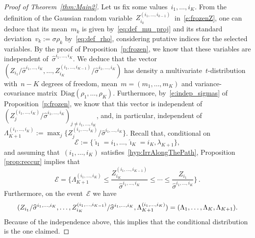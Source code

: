 \documentclass[final,numbib]{imaiai}%
\numberwithin{equation}{section}
\def\eq{\begin{equation}}
\def\qe{\end{equation}}
\renewcommand{\hat}{\widehat}
\newcommand{\<}{\langle}
\renewcommand{\>}{\rangle}
\newcommand{\1}{\mathds{1}}
\begin{document}
{\begin{proof}[Proof of Theorem~\ref{thm:Main2}]
Let us fix some values~$i_1, \ldots, i_{K}$. From the definition of the Gaussian random variable~$ Z_{i_k}^{(i_1,\ldots, i_{k-1})}~$ in~\eqref{e:frozenZ}, one can deduce that its mean~$m_k$ is given by~\eqref{eq:def_mu_proj} and its standard deviation~$v_k:=\sigma\rho_k$ by~\eqref{eq:def_rho}, considering putative indices for the selected variables. By the proof of Proposition~\ref{p:frozen}, we know that these variables are independent of~$\hat \sigma^{i_1,\ldots, i_{K}}$. We deduce that the vector~$(Z_{i_1}/\hat \sigma^{i_1,\ldots, i_{K}},\ldots,Z_{i_{K}}^{(i_1,\ldots, i_{K-1})}/\hat \sigma^{i_1,\ldots, i_{K}})$ has density a multivariate~$t$-distribution with~${n-K}$ degrees of freedom, mean~$m=(m_1,\ldots,m_K)$ and variance-covariance matrix~$\mathrm{Diag}(\rho_1,\ldots,\rho_K)$. Furthermore, by~\eqref{e:indep_sigmas} of Proposition~\ref{p:frozen}, we know that this vector is independent of  $({Z^{(i_1,\ldots, i_{K})}_j}/{\hat \sigma^{i_1,\ldots, i_{K}}})_{ j\neq i_1, \ldots, i_{K}}$, and, in particular, independent of $\Lambda_{K+1}^{(i_1,\ldots, i_{K})}:=\max_j\{{Z^{(i_1,\ldots, i_{K})}_j}/{\hat \sigma^{i_1,\ldots, i_{K}}}\}$. Recall that, conditional on 
 \[
 \mathcal E:=\{\hat \imath_1 =i_1, \ldots, \hat \imath_{K}=i_{K},\lambda_{K+1}\},
 \] and assuming that~$(i_1,\ldots, i_K)$ satisfies~\eqref{hyp:IrrAlongThePath}, Proposition \ref{prop:reccur} implies that 
 \[
 \mathcal E=\Bigg\{\Lambda_{K+1}^{(i_1,\ldots, i_{K})}\leq \frac{Z_{i_{K}}^{(i_1,\ldots, i_{K-1})}}{\hat \sigma^{i_1,\ldots, i_{K}}} \leq  \cdots \leq \frac{Z_{i_1}}{\hat \sigma^{i_1,\ldots, i_{K}}}\Bigg\}\,.
 \]
Furthermore, on the event~$\mathcal E$ we have
\eq
\notag
(Z_{i_1}/\hat \sigma^{i_1,\ldots, i_{K}},  \ldots, Z_{i_{K}}^{(i_1,\ldots, i_{K-1})}/\hat \sigma^{i_1,\ldots, i_{K}},\Lambda_{K+1}^{(i_1,\ldots, i_{K})})
=
(\Lambda_1,\ldots,\Lambda_{K},\Lambda_{K+1}).
\qe
Because of the independence above, this implies that the conditional distribution is the one claimed.
\end{proof}

\newpage

}
\end{document}
